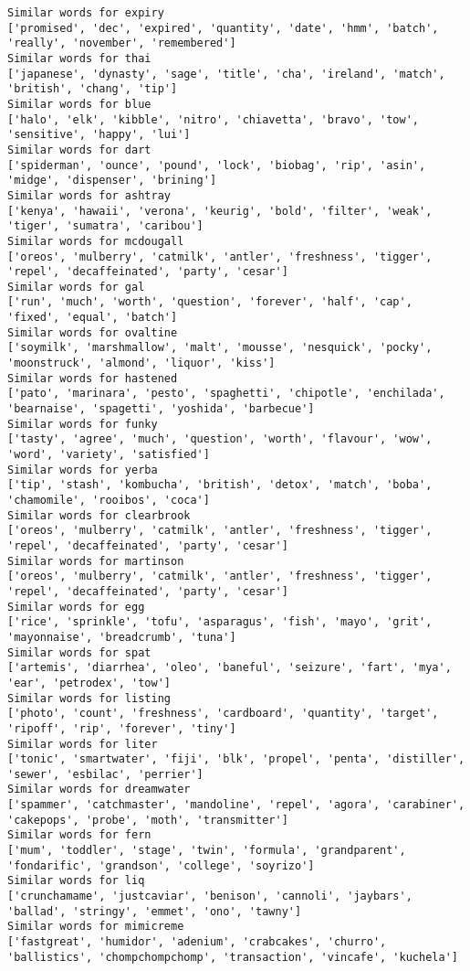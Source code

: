 \documentclass[11pt]{article}
\begin{document}
\begin{Verbatim}[commandchars=\\\{\}]
Similar words for expiry
['promised', 'dec', 'expired', 'quantity', 'date', 'hmm', 'batch', 'really', 'november', 'remembered']
Similar words for thai
['japanese', 'dynasty', 'sage', 'title', 'cha', 'ireland', 'match', 'british', 'chang', 'tip']
Similar words for blue
['halo', 'elk', 'kibble', 'nitro', 'chiavetta', 'bravo', 'tow', 'sensitive', 'happy', 'lui']
Similar words for dart
['spiderman', 'ounce', 'pound', 'lock', 'biobag', 'rip', 'asin', 'midge', 'dispenser', 'brining']
Similar words for ashtray
['kenya', 'hawaii', 'verona', 'keurig', 'bold', 'filter', 'weak', 'tiger', 'sumatra', 'caribou']
Similar words for mcdougall
['oreos', 'mulberry', 'catmilk', 'antler', 'freshness', 'tigger', 'repel', 'decaffeinated', 'party', 'cesar']
Similar words for gal
['run', 'much', 'worth', 'question', 'forever', 'half', 'cap', 'fixed', 'equal', 'batch']
Similar words for ovaltine
['soymilk', 'marshmallow', 'malt', 'mousse', 'nesquick', 'pocky', 'moonstruck', 'almond', 'liquor', 'kiss']
Similar words for hastened
['pato', 'marinara', 'pesto', 'spaghetti', 'chipotle', 'enchilada', 'bearnaise', 'spagetti', 'yoshida', 'barbecue']
Similar words for funky
['tasty', 'agree', 'much', 'question', 'worth', 'flavour', 'wow', 'word', 'variety', 'satisfied']
Similar words for yerba
['tip', 'stash', 'kombucha', 'british', 'detox', 'match', 'boba', 'chamomile', 'rooibos', 'coca']
Similar words for clearbrook
['oreos', 'mulberry', 'catmilk', 'antler', 'freshness', 'tigger', 'repel', 'decaffeinated', 'party', 'cesar']
Similar words for martinson
['oreos', 'mulberry', 'catmilk', 'antler', 'freshness', 'tigger', 'repel', 'decaffeinated', 'party', 'cesar']
Similar words for egg
['rice', 'sprinkle', 'tofu', 'asparagus', 'fish', 'mayo', 'grit', 'mayonnaise', 'breadcrumb', 'tuna']
Similar words for spat
['artemis', 'diarrhea', 'oleo', 'baneful', 'seizure', 'fart', 'mya', 'ear', 'petrodex', 'tow']
Similar words for listing
['photo', 'count', 'freshness', 'cardboard', 'quantity', 'target', 'ripoff', 'rip', 'forever', 'tiny']
Similar words for liter
['tonic', 'smartwater', 'fiji', 'blk', 'propel', 'penta', 'distiller', 'sewer', 'esbilac', 'perrier']
Similar words for dreamwater
['spammer', 'catchmaster', 'mandoline', 'repel', 'agora', 'carabiner', 'cakepops', 'probe', 'moth', 'transmitter']
Similar words for fern
['mum', 'toddler', 'stage', 'twin', 'formula', 'grandparent', 'fondarific', 'grandson', 'college', 'soyrizo']
Similar words for liq
['crunchamame', 'justcaviar', 'benison', 'cannoli', 'jaybars', 'ballad', 'stringy', 'emmet', 'ono', 'tawny']
Similar words for mimicreme
['fastgreat', 'humidor', 'adenium', 'crabcakes', 'churro', 'ballistics', 'chompchompchomp', 'transaction', 'vincafe', 'kuchela']

\end{Verbatim}
\end{document}
